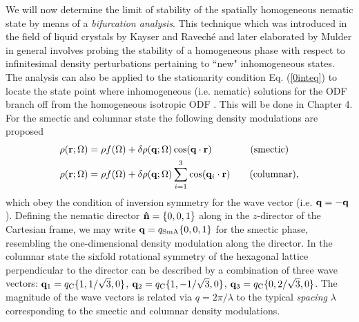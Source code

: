 \documentclass[amssymb]{revtex4}
\newcommand{\bfr}{{\bf r}}
\newcommand{\vq}{{\bf q}}
\begin{document}
We will now determine the limit of stability of the spatially homogeneous nematic
state by means of a {\em bifurcation analysis}. This technique which was introduced
in the field of liquid crystals by Kayser and Ravech\'{e} \cite{kayser} and later elaborated by Mulder \cite{mulderbifur} 
in general involves probing
the stability of a homogeneous phase with respect to 
infinitesimal density perturbations pertaining
to  ``new" inhomogeneous states. The  analysis can  also be
applied to the stationarity condition Eq. (\ref{0inteq})
to locate the state point where inhomogeneous (i.e. nematic) solutions for the ODF
branch off from the homogeneous isotropic ODF \cite{kayser}. 
This will be done in Chapter 4. 
For the smectic and columnar state the following  density modulations are proposed 
\begin{align}
\rho(\bfr;\Omega)&=\rho f(\Omega)+\delta \rho(\vq;\Omega)\cos(\vq \cdot \bfr)  \hspace{1.4cm} \text{(smectic)} \nonumber \\
\rho(\bfr;\Omega)&=\rho f(\Omega)+\delta \rho(\vq;\Omega)\sum _{i=1}^{3} \cos(\vq_{i}  \cdot \bfr) 
\hspace{0.7cm} \text{(columnar)},
\label{0densfluct}
\end{align}
which obey the condition of inversion symmetry for the wave vector (i.e. $\vq = -\vq$). 
Defining the nematic director ${\bf \hat{n}}=\{0,0,1\}$ along in the $z$-director
of the Cartesian frame, we may write $\vq=q_{\text{SmA}}\{0,0,1\}$
for the smectic phase, resembling the one-dimensional density modulation
along the director. In the columnar state the  sixfold rotational
symmetry of the hexagonal lattice perpendicular to the director can be described by a combination of three
wave vectors: $\vq _{1} =q _{\text{C}} \{ 1, 1/\sqrt{3},0 \}$, $\vq_{2} =q_{\text{C}} \{1,-1/\sqrt{3},0 \}$,
$\vq_{3} =q_{\text{C}} \{0,2/\sqrt{3},0 \}$. The magnitude of the wave vectors
is related via  $q=2\pi/\lambda$ to the typical {\em spacing} $\lambda$
corresponding to the smectic and columnar density modulations.
 
\end{document}
